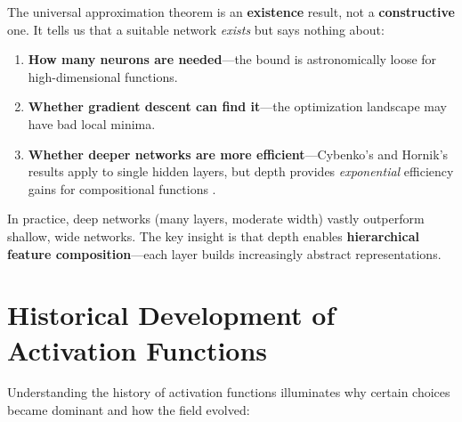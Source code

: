 The universal approximation theorem is an \textbf{existence} result, not a \textbf{constructive} one. It tells us that a suitable network \emph{exists} but says nothing about:
\begin{enumerate}
    \item \textbf{How many neurons are needed}---the bound is astronomically loose for high-dimensional functions.
    \item \textbf{Whether gradient descent can find it}---the optimization landscape may have bad local minima.
    \item \textbf{Whether deeper networks are more efficient}---Cybenko's and Hornik's results apply to single hidden layers, but depth provides \emph{exponential} efficiency gains for compositional functions \cite{montufar2014number}.
\end{enumerate}

In practice, deep networks (many layers, moderate width) vastly outperform shallow, wide networks. The key insight is that depth enables \textbf{hierarchical feature composition}---each layer builds increasingly abstract representations.

\section{Historical Development of Activation Functions}

Understanding the history of activation functions illuminates why certain choices became dominant and how the field evolved:

